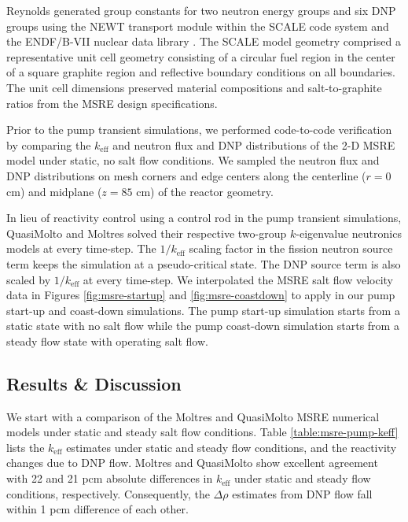 Reynolds generated group constants for two neutron energy groups and six \gls{DNP} groups using the
NEWT transport module within the SCALE code system \cite{rearden_scale_2018} and the ENDF/B-VII
nuclear data library \cite{chadwick_endf/b-vii.1_2011}. The SCALE model geometry comprised a
representative unit cell geometry
consisting of a circular fuel region in the center of a square graphite region and reflective
boundary conditions on all boundaries. The unit cell dimensions preserved material compositions
and salt-to-graphite ratios from the \gls{MSRE} design specifications.

Prior to the pump transient simulations, we performed code-to-code verification by comparing the
$k_\text{eff}$ and neutron flux and \gls{DNP} distributions of the 2-D \gls{MSRE} model under
static, no salt flow conditions. We sampled the neutron flux and \gls{DNP} distributions on
mesh corners and edge centers along the centerline ($r=0$ cm) and midplane ($z=85$ cm) of the
reactor geometry.

In lieu of reactivity control using a control rod in the pump
transient simulations, QuasiMolto and Moltres solved their respective
two-group $k$-eigenvalue neutronics models at every time-step. The $1/k_\text{eff}$ scaling factor
in the fission neutron source term keeps the simulation at a pseudo-critical state. The \gls{DNP}
source term is also scaled by $1/k_\text{eff}$ at every time-step. We interpolated the \gls{MSRE}
salt flow velocity data in Figures \ref{fig:msre-startup} and \ref{fig:msre-coastdown} to apply in
our pump start-up and coast-down simulations. The pump start-up simulation starts from a static
state with no salt flow while the pump coast-down simulation starts from a steady flow state with
operating salt flow.

\subsection{Results \& Discussion}

We start with a comparison of the Moltres and QuasiMolto \gls{MSRE} numerical models under static
and steady salt flow conditions. Table \ref{table:msre-pump-keff} lists the $k_\text{eff}$
estimates under static and steady flow conditions, and the reactivity changes due to \gls{DNP}
flow. Moltres and QuasiMolto show excellent agreement with 22 and 21 pcm absolute differences in
$k_\text{eff}$ under static and steady flow conditions, respectively. Consequently, the
$\Delta\rho$ estimates from \gls{DNP} flow fall within 1 pcm difference of each other.

